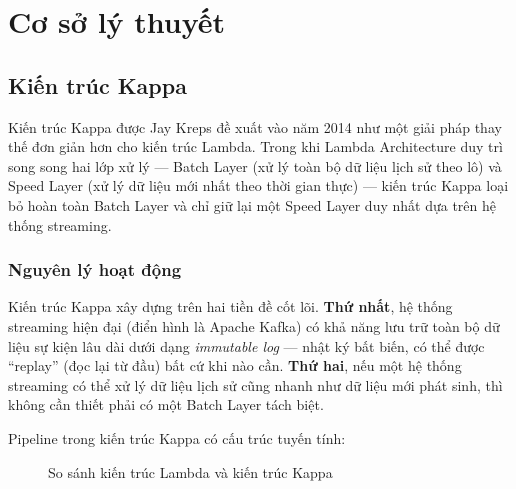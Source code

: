 \section{Cơ sở lý thuyết}

\subsection{Kiến trúc Kappa}

Kiến trúc Kappa được Jay Kreps đề xuất vào năm 2014 \cite{kreps2014kappa} như một
giải pháp thay thế đơn giản hơn cho kiến trúc Lambda. Trong khi Lambda Architecture
duy trì song song hai lớp xử lý --- Batch Layer (xử lý toàn bộ dữ liệu lịch sử
theo lô) và Speed Layer (xử lý dữ liệu mới nhất theo thời gian thực) --- kiến trúc
Kappa loại bỏ hoàn toàn Batch Layer và chỉ giữ lại một Speed Layer duy nhất dựa
trên hệ thống streaming.

\subsubsection{Nguyên lý hoạt động}

Kiến trúc Kappa xây dựng trên hai tiền đề cốt lõi. \textbf{Thứ nhất}, hệ thống
streaming hiện đại (điển hình là Apache Kafka) có khả năng lưu trữ toàn bộ dữ liệu
sự kiện lâu dài dưới dạng \emph{immutable log} --- nhật ký bất biến, có thể được
``replay'' (đọc lại từ đầu) bất cứ khi nào cần. \textbf{Thứ hai}, nếu một hệ thống
streaming có thể xử lý dữ liệu lịch sử cũng nhanh như dữ liệu mới phát sinh, thì
không cần thiết phải có một Batch Layer tách biệt.

Pipeline trong kiến trúc Kappa có cấu trúc tuyến tính:

\begin{figure}[H]
  \centering
  \setlength{\fboxsep}{12pt}
  \caption{So sánh kiến trúc Lambda và kiến trúc Kappa}
  \label{fig:kappa-lambda}
\end{figure}

